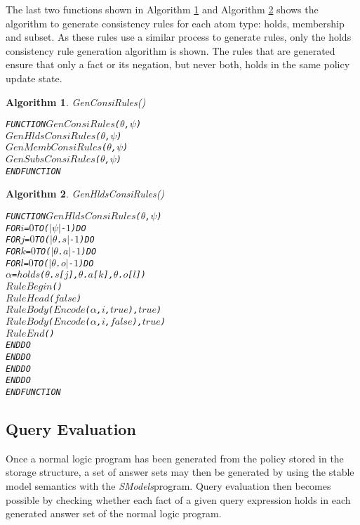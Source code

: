 \documentclass[11pt]{report}
\newenvironment{vverbatim}
{
  \begin{alltt}
}
{
    \vspace{-\baselineskip}
  \end{alltt}
}
\newtheorem{vvalgorithm}{Algorithm}[chapter]
\newenvironment{valgorithm}[2]
{
  \begin{vvalgorithm}{#1}
    \label{#2}
    \small
    \begin{vverbatim}
}
{
    \end{vverbatim}
  \end{vvalgorithm}
}
\begin{document}
          The last two functions shown in Algorithm \ref{algo-polup-gconr}
          and Algorithm \ref{algo-polup-ghcor} shows the algorithm to generate
          consistency rules for each atom type: holds, membership and subset.
          As these rules use a similar process to generate rules, only the
          holds consistency rule generation algorithm is shown. The rules that
          are generated ensure that only a fact or its negation, but never
          both, holds in the same policy update state.

          \begin{valgorithm}{GenConsiRules()}{algo-polup-gconr}
FUNCTION \(GenConsiRules\)(\(\theta\), \(\psi\))
  \(GenHldsConsiRules\)(\(\theta\), \(\psi\))
  \(GenMembConsiRules\)(\(\theta\), \(\psi\))
  \(GenSubsConsiRules\)(\(\theta\), \(\psi\))
ENDFUNCTION
          \end{valgorithm}

          \begin{valgorithm}{GenHldsConsiRules()}{algo-polup-ghcor}
FUNCTION \(GenHldsConsiRules\)(\(\theta\), \(\psi\))
  FOR \(i\) = \(0\) TO (\(|\psi|\) - \(1\)) DO
    FOR \(j\) = \(0\) TO (\(|\)\(\theta\).\(s\)\(|\) - \(1\)) DO
      FOR \(k\) = \(0\) TO (\(|\)\(\theta\).\(a\)\(|\) - \(1\)) DO
        FOR \(l\) = \(0\) TO (\(|\)\(\theta\).\(o\)\(|\) - \(1\)) DO
          \(\alpha\) = \(holds\)(\(\theta\).\(s\)[\(j\)], \(\theta\).\(a\)[\(k\)], \(\theta\).\(o\)[\(l\)])
          \(RuleBegin\)()
          \(RuleHead\)(\(false\))
          \(RuleBody\)(\(Encode\)(\(\alpha\), \(i\), \(true\)), \(true\))
          \(RuleBody\)(\(Encode\)(\(\alpha\), \(i\), \(false\)), \(true\))
          \(RuleEnd\)()
        ENDDO
      ENDDO
    ENDDO
  ENDDO
ENDFUNCTION
          \end{valgorithm}

      \subsection{Query Evaluation}
        \label{subs-polup-evalu}

        Once a normal logic program has been generated from the policy stored
        in the storage structure, a set of answer sets may then be generated
        by using the stable model semantics \cite{SIM1,NIE} with the
        {\em SModels}\footnotemark program. Query evaluation then becomes
        possible by checking whether each fact of a given query expression
        holds in each generated answer set of the normal logic program.
\end{document}
